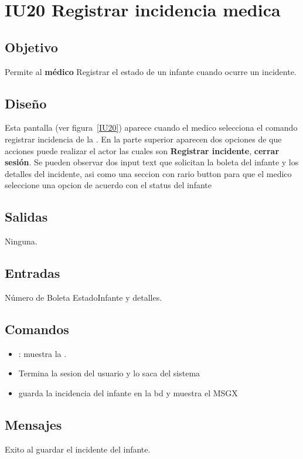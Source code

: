 \newpage
\section{IU20 Registrar incidencia medica}

\subsection{Objetivo}
	Permite al {\bf médico} Registrar el estado de un infante cuando ocurre un incidente.

\subsection{Diseño}
	Esta pantalla  (ver figura~\ref{IU20}) aparece cuando el medico selecciona el comando registrar incidencia de la . 
En la parte superior aparecen dos opciones de que acciones puede realizar el actor las cuales son {\bf Registrar incidente}, {\bf cerrar sesión}.
Se pueden observar dos input text que solicitan la boleta del infante y los detalles del incidente, asi como una seccion con rario button para que el medico seleccione una opcion de acuerdo con el status del infante
 

\subsection{Salidas}

	Ninguna.

\subsection{Entradas}
Número de Boleta EstadoInfante y detalles.

\subsection{Comandos}
\begin{itemize}
	\item {}: muestra la .
        \item {}Termina la sesion del usuario y lo saca del sistema
        \item {} guarda la incidencia del infante en la bd y muestra el MSGX
\end{itemize}

\subsection{Mensajes}

\begin{Citemize}
	\item Exito al guardar el incidente del infante.
\end{Citemize}

